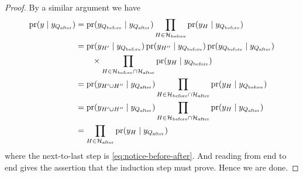 \begin{proof}
By a similar argument we have
\begin{align*}
   \operatorname{pr}(y \mid  y_{Q_\text{after}})
   & =
   \operatorname{pr}(y_{Q_\text{before}} \mid y_{Q_\text{after}})
   \prod_{H \in \mathcal{H}_\text{before}}
   \operatorname{pr}(y_H \mid y_{Q_\text{before}})
   \\
   & =
   \operatorname{pr}(y_{H'} \mid y_{Q_\text{before}})
   \operatorname{pr}(y_{H''} \mid y_{Q_\text{before}})
   \operatorname{pr}(y_{Q_\text{before}} \mid y_{Q_\text{after}})
   \\
   & \qquad
   \times
   \prod_{H \in \mathcal{H}_\text{before} \cap \mathcal{H}_\text{after}}
   \operatorname{pr}(y_H \mid y_{Q_\text{before}})
   \\
   & =
   \operatorname{pr}(y_{H' \cup H''} \mid  y_{Q_\text{after}})
   \prod_{H \in \mathcal{H}_\text{before} \cap \mathcal{H}_\text{after}}
   \operatorname{pr}(y_H \mid y_{Q_\text{before}})
   \\
   & =
   \operatorname{pr}(y_{H' \cup H''} \mid  y_{Q_\text{after}})
   \prod_{H \in \mathcal{H}_\text{before} \cap \mathcal{H}_\text{after}}
   \operatorname{pr}(y_H \mid y_{Q_\text{after}})
   \\
   & =
   \prod_{H \in \mathcal{H}_\text{after}}
   \operatorname{pr}(y_H \mid y_{Q_\text{after}})
\end{align*}
where the next-to-last step is \eqref{eq:notice-before-after}.
And reading from end to end gives the assertion that the induction step
must prove.  Hence we are done.
\end{proof}

